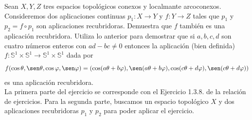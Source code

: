 \documentclass[12pt]{article}
\begin{document}
    \begin{ejercicio}
        Sean $X,Y,Z$ tres espacios topológicos conexos y localmante arcoconexos. Consideremos dos aplicaciones continuas $p_1:X\to Y$ y $f:Y\to Z$ tales que $p_1$ y $p_2=f\circ p_1$ son aplicaciones recubridoras. Demuestra que $f$ también es una aplicación recubridora.\newline
        Utiliza lo anterior para demostrar que si $a,b,c,d$ son cuatro números enteros con $ad-bc\neq 0$ entonces la aplicación (bien definida) $f:\mathbb{S}^1\times \mathbb{S}^1\to \mathbb{S}^1\times \mathbb{S}^1$ dada por
        \begin{equation*}
            f(\cos\theta,\sen\theta,\cos\varphi,\sen\varphi) = (\cos(a\theta + b\varphi), \sen(a\theta + b\varphi), \cos(c\theta + d\varphi), \sen(c\theta + d\varphi))
        \end{equation*}
        es una aplicación recubridora.\\

        \noindent
        La primera parte del ejercicio se corresponde con el Ejercicio 1.3.8. de la relación de ejercicios. Para la segunda parte, buscamos un espacio topológico $X$ y dos aplicaciones recubridoras $p_1$ y $p_2$ para poder aplicar el ejercicio.\\


\end{ejercicio}
\end{document}
